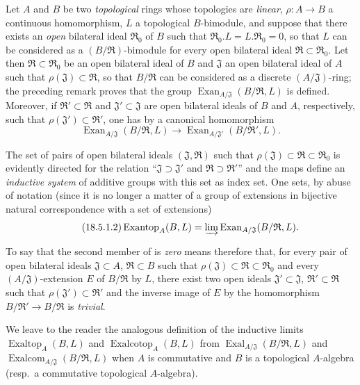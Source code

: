 \begin{env}[18.5.1]
\label{0.18.5.1}
Let $A$ and $B$ be two \emph{topological} rings whose topologies are \emph{linear}, $\rho:A\to B$ a continuous homomorphism, $L$ a topological $B$-bimodule, and suppose that there exists an \emph{open} bilateral ideal $\mathfrak{R}_0$ of $B$ such that $\mathfrak{R}_0.L=L.\mathfrak{R}_0=0$, so that $L$ can be
considered as a $(B/\mathfrak{R})$-bimodule for every open bilateral ideal $\mathfrak{R}\subset\mathfrak{R}_0$.
Let then $\mathfrak{R}\subset\mathfrak{R}_0$ be an open bilateral ideal of $B$ and $\mathfrak{J}$ an open bilateral ideal of $A$ such that $\rho(\mathfrak{J})\subset\mathfrak{R}$, so that $B/\mathfrak{R}$ can be considered as a discrete $(A/\mathfrak{J})$-ring; the preceding remark proves that the group $\operatorname{Exan}_{A/\mathfrak{J}}(B/\mathfrak{R},L)$ is defined.
Moreover, if $\mathfrak{R}'\subset\mathfrak{R}$ and $\mathfrak{J}'\subset\mathfrak{J}$ are open bilateral ideals of $B$ and $A$, respectively, such that $\rho(\mathfrak{J}')\subset\mathfrak{R}'$, one has by  a canonical homomorphism
\begin{equation}
\tag{18.5.1.1}
  \label{0.18.5.1.1}
  \operatorname{Exan}_{A/\mathfrak{J}}(B/\mathfrak{R},L)\to\operatorname{Exan}_{A/\mathfrak{J}'}(B/\mathfrak{R}',L).
\end{equation}

The set of pairs of open bilateral ideals $(\mathfrak{J},\mathfrak{R})$ such that $\rho(\mathfrak{J})\subset\mathfrak{R}\subset\mathfrak{R}_0$ is evidently directed for the relation ``$\mathfrak{J}\supset\mathfrak{J}'$ and $\mathfrak{R}\supset\mathfrak{R}'$'' and the maps  define an \emph{inductive system} of additive groups with this set as index set.
One sets, by abuse of notation (since it is no longer a matter of a group of extensions in bijective natural correspondence with a set of extensions)
\begin{equation}
\tag{18.5.1.2}
  \label{0.18.5.1.2}
  \operatorname{Exantop}_A(B,L)=\varinjlim\operatorname{Exan}_{A/\mathfrak{J}}(B/\mathfrak{R},L).
\end{equation}

To say that the second member of  is \emph{zero} means therefore that, for every pair of open bilateral ideals $\mathfrak{J}\subset A$, $\mathfrak{R}\subset B$ such that $\rho(\mathfrak{J})\subset\mathfrak{R}\subset\mathfrak{R}_0$ and every $(A/\mathfrak{J})$-extension $E$ of $B/\mathfrak{R}$ by $L$, there exist two open ideals $\mathfrak{J}'\subset\mathfrak{J}$, $\mathfrak{R}'\subset\mathfrak{R}$ such that $\rho(\mathfrak{J}')\subset\mathfrak{R}'$ and the inverse image of $E$ by the homomorphism $B/\mathfrak{R}'\to B/\mathfrak{R}$ is \emph{trivial}.

We leave to the reader the analogous definition of the inductive limits $\operatorname{Exaltop}_A(B,L)$ and $\operatorname{Exalcotop}_A(B,L)$ from $\operatorname{Exal}_{A/\mathfrak{J}}(B/\mathfrak{R},L)$ and $\operatorname{Exalcom}_{A/\mathfrak{J}}(B/\mathfrak{R},L)$ when $A$ is commutative and $B$ is a topological $A$-algebra (resp.\ a commutative topological $A$-algebra).
\end{env}


